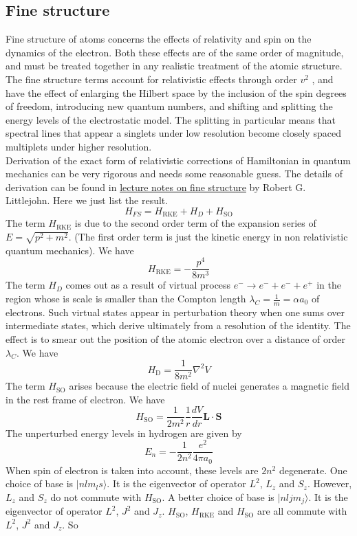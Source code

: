 \documentclass[cyan]{elegantnote}
\begin{document}
\subsection{Fine structure}
Fine structure of atoms concerns the effects of relativity and spin on the dynamics of the electron. Both these effects are of the same order of magnitude, and must be treated together in any realistic treatment of the atomic structure.\\
The fine structure terms account for relativistic effects through order $v^2$ , and have the effect of enlarging the Hilbert space by the inclusion of the spin degrees of freedom, introducing new quantum numbers, and shifting and splitting the energy levels of the electrostatic model. 
The splitting in particular means that spectral lines that appear a singlets under low resolution become closely spaced multiplets under higher resolution.\\
Derivation of the exact form of relativistic corrections of Hamiltonian in quantum mechanics can be very rigorous and needs some reasonable guess. The details of derivation can be found in 
\href{http://bohr.physics.berkeley.edu/classes/221/1112/notes/finestruc.pdf}{lecture notes on fine structure} by Robert G. Littlejohn. Here we just list the result.
\[H_{FS} = H_{\mathrm{RKE}} + H_{D} + H_{\mathrm{SO}}\]
The term $H_{\mathrm{RKE}}$ is due to the second order term of the expansion series of $E = \sqrt{p^2+m^2}$. (The first order term is just the kinetic energy in non relativistic quantum mechanics). We have
\[H_{\mathrm{RKE}} = - \frac{p^4}{8m^3}\]
The term $H_{D}$ comes out as a result of virtual process $e^{-} \to e^{-} + e^{-} + e^{+}$ in the region whose is scale is smaller than the Compton length $\lambda_C = \frac{1}{m} = \alpha a_0$ of electrons. Such virtual states appear in perturbation theory when one sums over intermediate states, which derive ultimately from a resolution of the identity. The effect is to smear out the position of the atomic electron
over a distance of order $\lambda_C$. We have
\[H_{\mathrm{D}} = \frac{1}{8m^2} \nabla^2 V\]
The term $H_{\mathrm{SO}}$ arises because the electric field of nuclei generates a magnetic field in the rest frame of electron. We have
\[H_{\mathrm{SO}} = \frac{1}{2m^2} \frac{1}{r} \frac{dV}{dr} \bm{L}\cdot\bm{S}\]
The unperturbed energy levels in hydrogen are given by
\[E_n = -\frac{1}{2n^2} \frac{e^2}{4\pi a_0}\]
When spin of electron is taken into account,  these levels are $2n^2$ degenerate. One choice of base is $|nlm_{l}s\rangle$. It is the eigenvector of operator $L^2$, $L_z$ and $S_z$. However, $L_z$ and $S_z$ do not commute with $H_{\mathrm{SO}}$. A better choice of base is $|nljm_j\rangle$. It is the eigenvector of operator $L^2$, $J^2$ and $J_z$. $H_{\mathrm{SO}}$, $H_{\mathrm{RKE}}$ and $H_{\mathrm{SO}}$ are all commute with $L^2$, $J^2$ and $J_z$. So
\end{document}

